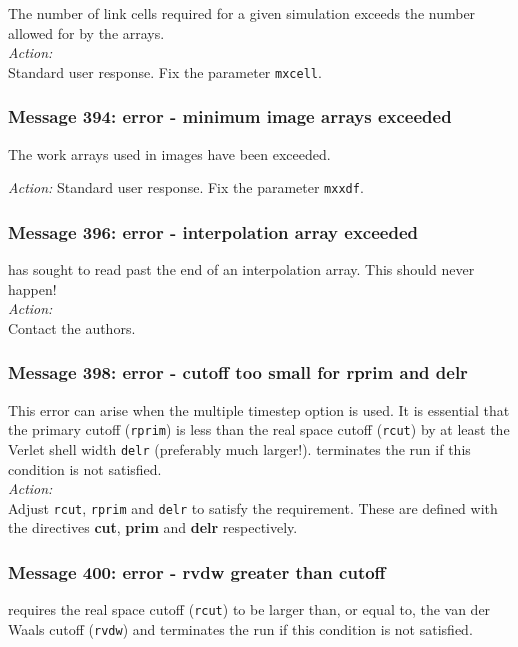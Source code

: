 The number of link cells required for a given simulation exceeds the
number allowed for by the \D{} arrays. \\

\noindent
{\em Action:} \\
Standard user response. Fix the parameter {\tt mxcell}.

\subsubsection*{Message 394: error - minimum image arrays exceeded}

The work arrays used in {\sc images} have been exceeded.

\noindent
{\em Action:} Standard user response. Fix the parameter {\tt mxxdf}.

\subsubsection*{Message 396: error - interpolation array exceeded}
\D{} has sought to read past the end of an interpolation array. This should
never happen!\\

\noindent
{\em Action:} \\
Contact the authors.

\subsubsection*{Message 398: error - cutoff too small for rprim and
delr}

This error can arise when the multiple timestep  option is used. It is
essential that the primary cutoff ({\tt rprim}) is less than the real
space cutoff ({\tt rcut}) by at least the Verlet shell
width {\tt delr} (preferably much larger!). \D{} terminates
the run if this condition is not satisfied. \\

\noindent
{\em Action:} \\
Adjust {\tt rcut}, {\tt rprim} and {\tt delr} to satisfy the
\D{} requirement. These are defined with the directives {\bf cut}, {\bf
prim} and {\bf delr} respectively.

\subsubsection*{Message 400: error - rvdw greater than cutoff}

\D{} requires the real space cutoff ({\tt rcut}) 
to be larger than, or equal to, the van der Waals  cutoff ({\tt rvdw})
and terminates the run if this condition is not satisfied. \\

